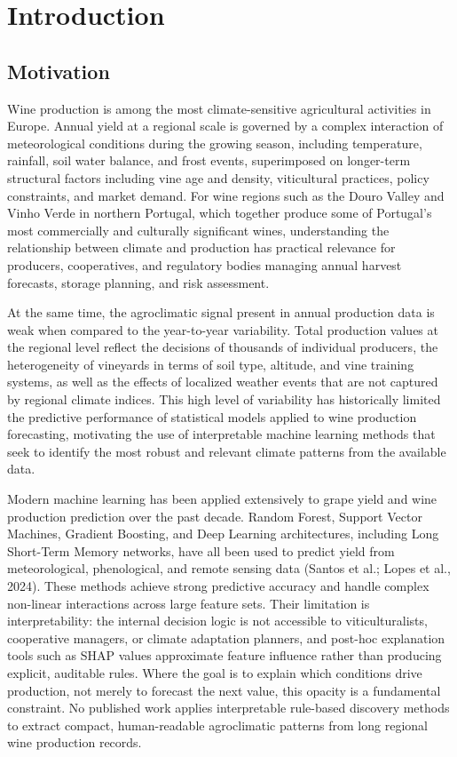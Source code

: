 
\chapter{Introduction}\label{ch:introduction}


\section{Motivation}\label{sec:motivation}

Wine production is among the most climate-sensitive agricultural activities in Europe. Annual yield at a regional scale is governed by a complex interaction of meteorological conditions during the growing season, including temperature, rainfall, soil water balance, and frost events, superimposed on longer-term structural factors including vine age and density, viticultural practices, policy constraints, and market demand. For wine regions such as the Douro Valley and Vinho Verde in northern Portugal, which together produce some of Portugal's most commercially and culturally significant wines, understanding the relationship between climate and production has practical relevance for producers, cooperatives, and regulatory bodies managing annual harvest forecasts, storage planning, and risk assessment.

At the same time, the agroclimatic signal present in annual production data is weak when compared to the year-to-year variability. Total production values at the regional level reflect the decisions of thousands of individual producers, the heterogeneity of vineyards in terms of soil type, altitude, and vine training systems, as well as the effects of localized weather events that are not captured by regional climate indices. This high level of variability has historically limited the predictive performance of statistical models applied to wine production forecasting, motivating the use of interpretable machine learning methods that seek to identify the most robust and relevant climate patterns from the available data.

Modern machine learning has been applied extensively to grape yield and wine production prediction over the past decade. Random Forest, Support Vector Machines, Gradient Boosting, and Deep Learning architectures, including Long Short-Term Memory networks, have all been used to predict yield from meteorological, phenological, and remote sensing data (Santos et al.; Lopes et al., 2024). These methods achieve strong predictive accuracy and handle complex non-linear interactions across large feature sets. Their limitation is interpretability: the internal decision logic is not accessible to viticulturalists, cooperative managers, or climate adaptation planners, and post-hoc explanation tools such as SHAP values approximate feature influence rather than producing explicit, auditable rules. Where the goal is to explain which conditions drive production, not merely to forecast the next value, this opacity is a fundamental constraint. No published work applies interpretable rule-based discovery methods to extract compact, human-readable agroclimatic patterns from long regional wine production records.

